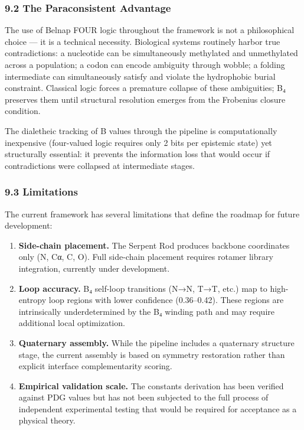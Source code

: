 \hypertarget{the-paraconsistent-advantage}{%
\subsubsection{9.2 The Paraconsistent
Advantage}\label{the-paraconsistent-advantage}}

The use of Belnap FOUR logic throughout the framework is not a
philosophical choice --- it is a technical necessity. Biological systems
routinely harbor true contradictions: a nucleotide can be simultaneously
methylated and unmethylated across a population; a codon can encode
ambiguity through wobble; a folding intermediate can simultaneously
satisfy and violate the hydrophobic burial constraint. Classical logic
forces a premature collapse of these ambiguities; B₄ preserves them
until structural resolution emerges from the Frobenius closure
condition.

The dialetheic tracking of B values through the pipeline is
computationally inexpensive (four-valued logic requires only 2 bits per
epistemic state) yet structurally essential: it prevents the information
loss that would occur if contradictions were collapsed at intermediate
stages.

\hypertarget{limitations}{%
\subsubsection{9.3 Limitations}\label{limitations}}

The current framework has several limitations that define the roadmap
for future development:

\begin{enumerate}
\def\labelenumi{\arabic{enumi}.}
\item
  \textbf{Side-chain placement.} The Serpent Rod produces backbone
  coordinates only (N, Cα, C, O). Full side-chain placement requires
  rotamer library integration, currently under development.
\item
  \textbf{Loop accuracy.} B₄ self-loop transitions (N→N, T→T, etc.) map
  to high-entropy loop regions with lower confidence (0.36--0.42). These
  regions are intrinsically underdetermined by the B₄ winding path and
  may require additional local optimization.
\item
  \textbf{Quaternary assembly.} While the pipeline includes a quaternary
  structure stage, the current assembly is based on symmetry restoration
  rather than explicit interface complementarity scoring.
\item
  \textbf{Empirical validation scale.} The constants derivation has been
  verified against PDG values but has not been subjected to the full
  process of independent experimental testing that would be required for
  acceptance as a physical theory.
\end{enumerate}

